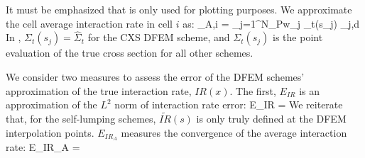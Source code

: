 It must be emphasized that  is only used for plotting purposes.  
We approximate the cell average interaction rate in cell $i$ as:
\benum
\label{eq:ia_calc}
_{A,i} = \sum_{j=1}^{N_P}{w_j \Sigma_t(s_j) \psi_{j,d} }\pep
\eenum
In , $\Sigma_t(s_j) = \hat{\Sigma}_t$ for the CXS DFEM scheme, and $\Sigma_t(s_j)$ is the point evaluation of the true cross section for all other schemes.

We consider two measures to assess the error of the DFEM schemes' approximation of the true interaction rate, $IR(x)$.  The first, $E_{IR}$ is an approximation of the $L^2$ norm of interaction rate error:
\benum
E_{IR} =  \pep
\label{eq:EIR}
\eenum
We reiterate that, for the self-lumping schemes, $\widetilde{IR}(s)$ is only truly defined at the DFEM interpolation points.
$E_{IR_A}$ measures the convergence of the average interaction rate:
\benum
E_{IR_A} =  \pep
\eenum

